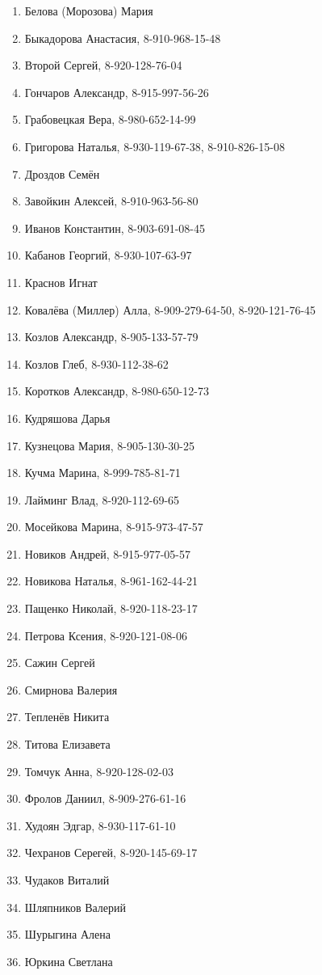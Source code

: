 \begin{enumerate}
\item Белова (Морозова) Мария
\item Быкадорова Анастасия, 8-910-968-15-48
\item Второй Сергей, 8-920-128-76-04
\item Гончаров Александр, 8-915-997-56-26
\item Грабовецкая Вера, 8-980-652-14-99
\item Григорова Наталья, 8-930-119-67-38, 8-910-826-15-08
\item Дроздов Семён
\item Завойкин Алексей, 8-910-963-56-80
\item Иванов Константин, 8-903-691-08-45
\item Кабанов Георгий, 8-930-107-63-97
\item Краснов Игнат
\item Ковалёва (Миллер) Алла, 8-909-279-64-50, 8-920-121-76-45
\item Козлов Александр, 8-905-133-57-79
\item Козлов Глеб, 8-930-112-38-62
\item Коротков Александр, 8-980-650-12-73
\item Кудряшова Дарья
\item Кузнецова Мария, 8-905-130-30-25
\item Кучма Марина, 8-999-785-81-71
\item Лайминг Влад, 8-920-112-69-65
\item Мосейкова Марина, 8-915-973-47-57
\item Новиков Андрей, 8-915-977-05-57
\item Новикова Наталья, 8-961-162-44-21
\item Пащенко Николай, 8-920-118-23-17
\item Петрова Ксения, 8-920-121-08-06
\item Сажин Сергей
\item Смирнова Валерия
\item Тепленёв Никита
\item Титова Елизавета
\item Томчук Анна, 8-920-128-02-03
\item Фролов Даниил, 8-909-276-61-16
\item Худоян Эдгар, 8-930-117-61-10
\item Чехранов Серегей, 8-920-145-69-17
\item Чудаков Виталий
\item Шляпников Валерий
\item Шурыгина Алена
\item Юркина Светлана
\end{enumerate}
